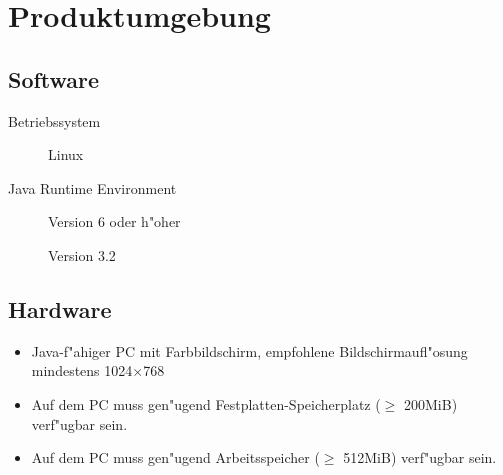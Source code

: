 \section{Produktumgebung}%

\subsection{Software}%

\begin{description}%
    \item [Betriebssystem] Linux%
    \item [Java Runtime Environment] Version 6 oder h"oher
    \item [] Version 3.2%
\end{description}%

\subsection{Hardware}%


\begin{itemize}%
    \item Java-f"ahiger PC mit Farbbildschirm, empfohlene Bildschirmaufl"osung mindestens 1024$\times$768%
    \item Auf dem PC muss gen"ugend Festplatten-Speicherplatz ($\ge$ 200MiB) verf"ugbar sein.%
    \item Auf dem PC muss gen"ugend Arbeitsspeicher ($\ge$ 512MiB) verf"ugbar sein.%
\end{itemize}%
